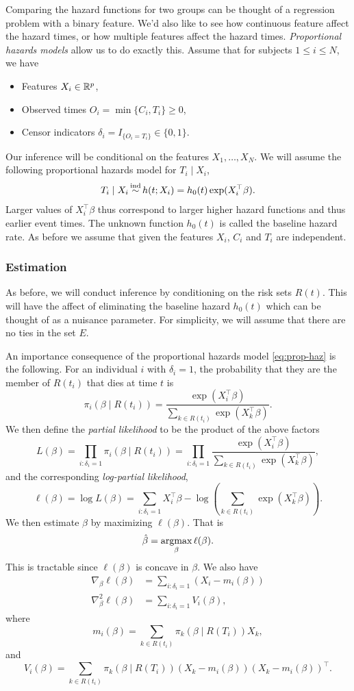 Comparing the hazard functions for two groups can be thought of a regression problem with a binary feature. We'd also like to see how continuous feature affect the hazard times, or how multiple features affect the hazard times. \emph{Proportional hazards models} allow us to do exactly this. Assume that for subjects $1 \le i \le N$, we have
\begin{itemize}
    \item Features $X_i \in \mathbb{R}^p$,
    \item Observed times $O_i = \min\{C_i,T_i\} \ge 0$,
    \item Censor indicators $\delta_i = I_{\{O_i = T_i\}} \in \{0,1\}$.
\end{itemize}
Our inference will be conditional on the features $X_1,\ldots,X_N$. We will assume the following proportional hazards model for $T_i \mid X_i$,
\begin{align}
    T_i\mid X_i \simind h(t;X_i) = h_0(t)\exp(X_i^\top \beta). \label{eq:prop-haz}
\end{align}
Larger values of $X_i^\top \beta$ thus correspond to larger higher hazard functions and thus earlier event times. The unknown function $h_0(t)$ is called the baseline hazard rate.
As before we assume that given the features $X_i$, $C_i$ and $T_i$ are independent. 

\subsubsection*{Estimation}

As before, we will conduct inference by conditioning on the risk sets $R(t)$. This will have the affect of eliminating the baseline hazard $h_0(t)$ which can be thought of as a nuisance parameter. For simplicity, we will assume that there are no ties in the set $E$.

An importance consequence of the proportional hazards model \eqref{eq:prop-haz} is the following. For an individual $i$ with $\delta_i=1$, the probability that they are the member of $R(t_i)$ that dies at time $t$ is 
\[\pi_i(\beta\mid R(t_i)) = \frac{\exp(X_i^\top \beta)}{\sum_{k \in R(t_i)} \exp(X_k^\top \beta)}. \]
We then define the \emph{partial likelihood} to be the product of the above factors 
\[L(\beta) = \prod_{i:\delta_i=1} \pi_i(\beta \mid R(t_i)) = \prod_{i:\delta_i = 1}\frac{\exp(X_i^\top \beta)}{\sum_{k \in R(t_i)} \exp(X_k^\top \beta)}, \]
and the corresponding \emph{log-partial likelihood},
\[\ell(\beta) = \log L(\beta) = \sum_{i:\delta_i = 1} X_i^\top \beta -\log \left(\sum_{k \in R(t_i)} \exp(X_k^\top \beta)\right). \]
We then estimate $\beta$ by maximizing $\ell(\beta)$. That is
\[\hat{\beta} = \operatorname*{argmax}_{\beta} \ell(\beta). \]
This is tractable since $\ell(\beta)$ is concave in $\beta$. We also have
\begin{align*}
    \nabla_\beta \ell(\beta) &=\sum_{i :\delta_i = 1}\left( X_i - m_i(\beta)\right)\\
    \nabla^2_\beta \ell(\beta) &=\sum_{i:\delta_i=1}V_i(\beta),
\end{align*}
where
\[m_i(\beta) = \sum_{k \in R(t_i)}\pi_k(\beta \mid R(T_i))X_k,\]
and
\[ V_i(\beta) = \sum_{k \in R(t_i)}\pi_k(\beta \mid R(T_i))(X_k - m_i(\beta))(X_k - m_i(\beta))^\top.\]

